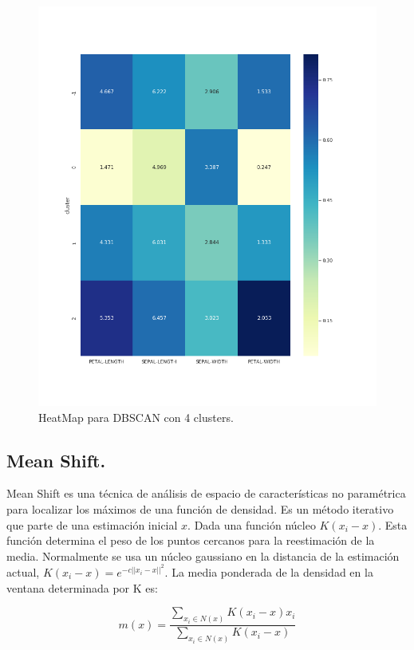 \documentclass[a4paper, 20pt]{article}
\begin{document}
\begin{figure}[h]
\centering
\includegraphics[scale=0.62]{dani/heatmapDBSCANIRIS.png}
\caption{HeatMap para DBSCAN con 4 clusters.}
\label{hmdb}
\end{figure}

\clearpage

\subsection{Mean Shift.}

Mean Shift es una técnica de análisis de espacio de características no paramétrica para localizar los máximos de una función de densidad. Es un método iterativo que parte de una estimación inicial $x$. Dada una función núcleo $K(x_i-x)$. Esta función determina el peso de los puntos cercanos para la reestimación de la media. Normalmente se usa un núcleo gaussiano en la distancia de la estimación actual, $K(x_i-x)=e^{-c||x_i-x||^2}$. La media ponderada de la densidad en la ventana determinada por K es:

$$m(x)=\dfrac{\sum_{x_i\in N(x)}K(x_i-x)x_i}{\sum_{x_i\in N(x)}K(x_i-x)}$$
\end{document}
